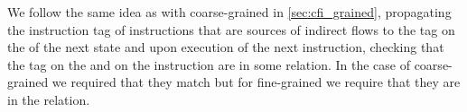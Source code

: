 We follow the same idea as with coarse-grained \CFI in
\cref{sec:cfi_grained}, propagating the instruction tag of
instructions that are sources of indirect flows to the tag on the \pc
of the next state and upon execution of the next instruction, checking
that the tag on the \pc and on the instruction are in some
relation. In the case of coarse-grained \CFI we required that they
match but for fine-grained \CFI we require that they are in the \CFG
relation.



